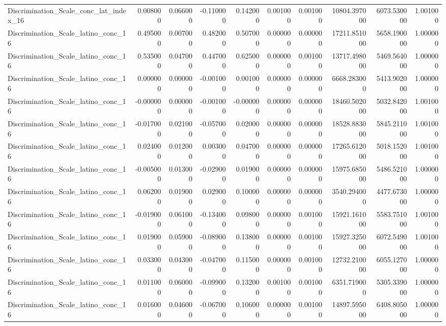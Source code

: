 \begin{table}
\begin{tabular}{lrrrrrrrrr}
Discrimination_Scale_conc_lat_index_16 & 0.008000 & 0.066000 & -0.110000 & 0.142000 & 0.001000 & 0.001000 & 10804.397000 & 6073.530000 & 1.001000 \\
Discrimination_Scale_latino_conc_16 & 0.495000 & 0.007000 & 0.482000 & 0.507000 & 0.000000 & 0.000000 & 17211.851000 & 5658.190000 & 1.000000 \\
Discrimination_Scale_latino_conc_16 & 0.535000 & 0.047000 & 0.447000 & 0.625000 & 0.000000 & 0.001000 & 13717.498000 & 5469.564000 & 1.000000 \\
Discrimination_Scale_latino_conc_16 & 0.000000 & 0.000000 & -0.001000 & 0.001000 & 0.000000 & 0.000000 & 6668.283000 & 5413.902000 & 1.000000 \\
Discrimination_Scale_latino_conc_16 & -0.000000 & 0.000000 & -0.001000 & -0.000000 & 0.000000 & 0.000000 & 18460.502000 & 5032.842000 & 1.001000 \\
Discrimination_Scale_latino_conc_16 & -0.017000 & 0.021000 & -0.057000 & 0.020000 & 0.000000 & 0.000000 & 18528.883000 & 5845.211000 & 1.001000 \\
Discrimination_Scale_latino_conc_16 & 0.024000 & 0.012000 & 0.003000 & 0.047000 & 0.000000 & 0.000000 & 17265.612000 & 5018.152000 & 1.001000 \\
Discrimination_Scale_latino_conc_16 & -0.005000 & 0.013000 & -0.029000 & 0.019000 & 0.000000 & 0.000000 & 15975.685000 & 5486.521000 & 1.000000 \\
Discrimination_Scale_latino_conc_16 & 0.062000 & 0.019000 & 0.029000 & 0.100000 & 0.000000 & 0.000000 & 3540.294000 & 4477.673000 & 1.000000 \\
Discrimination_Scale_latino_conc_16 & -0.019000 & 0.061000 & -0.134000 & 0.098000 & 0.000000 & 0.001000 & 15921.161000 & 5583.751000 & 1.001000 \\
Discrimination_Scale_latino_conc_16 & 0.019000 & 0.059000 & -0.089000 & 0.138000 & 0.000000 & 0.001000 & 15927.325000 & 6072.549000 & 1.001000 \\
Discrimination_Scale_latino_conc_16 & 0.033000 & 0.043000 & -0.047000 & 0.115000 & 0.000000 & 0.001000 & 12732.210000 & 6055.127000 & 1.000000 \\
Discrimination_Scale_latino_conc_16 & 0.011000 & 0.060000 & -0.099000 & 0.132000 & 0.001000 & 0.001000 & 6351.719000 & 5305.339000 & 1.000000 \\
Discrimination_Scale_latino_conc_16 & 0.016000 & 0.046000 & -0.067000 & 0.106000 & 0.000000 & 0.001000 & 14897.595000 & 6408.805000 & 1.000000 \\

\end{tabular}
\end{table}
